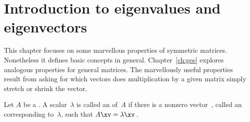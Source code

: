 

\section{Introduction to eigenvalues and eigenvectors}
\label{sec:iee}
\secttoc

\begin{comment}
\pooliv{\S4.1} \layiv{\S5.1} \holti{\S6.1}  \cite[Ch.~8, 11]{Chartier2015}
\end{comment}


This chapter focuses on some marvellous properties of symmetric matrices.  
Nonetheless it defines basic concepts in general.  
Chapter~\ref{ch:gee} explores analogous properties for general matrices.
The marvellously useful properties result from asking for which vectors does multiplication by a given matrix simply stretch or shrink the vector.


\begin{definition} \label{def:evecval}
Let \(A\) be a .  
A scalar~\(\lambda\) is called an  of~\(A\) if there is a nonzero vector~\xv, called an  corresponding to~\(\lambda\), such that \(A\xv=\lambda\xv\)\,.  
\end{definition}


